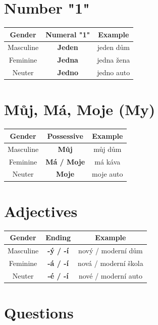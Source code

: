 \section{Number "1"}

\begin{center}
\begin{tabular}{ccc}
\hline
\textbf{Gender} & \textbf{Numeral "1"} & \textbf{Example} \\ \hline
Masculine & \textbf{Jeden} & jeden dům \\
Feminine & \textbf{Jedna} & jedna žena \\
Neuter & \textbf{Jedno} & jedno auto \\ \hline
\end{tabular}
\end{center}

\section{Můj, Má, Moje (My)}

\begin{center}
\begin{tabular}{ccc}
\hline
\textbf{Gender} & \textbf{Possessive} & \textbf{Example} \\ \hline
Masculine & \textbf{Můj} & můj dům \\
Feminine & \textbf{Má / Moje} & má káva \\
Neuter & \textbf{Moje} & moje auto \\ \hline
\end{tabular}
\end{center}

\section{Adjectives}
\begin{center}
\begin{tabular}{ccc}
\hline
\textbf{Gender} & \textbf{Ending} & \textbf{Example} \\ \hline
Masculine & \textbf{-ý / -í} & nový / moderní dům \\
Feminine & \textbf{-á / -í} & nová / moderní škola \\
Neuter & \textbf{-é / -í} & nové / moderní auto \\ \hline
\end{tabular}
\end{center}

\section{Questions}

